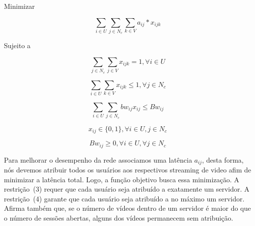 
Minimizar

\begin{equation}\label{maximize}
\sum_{i \in U} 
\sum_{j \in N_{c}}
\sum_{k \in V}
a_{ij} \ast x_{ijk}
\end{equation}

Sujeito a

\begin{equation}\label{bound_1}
\sum_{ j \in N_{c} }
\sum_{ j \in V}
x_{ijk} = 1,  \forall i \in U
\end{equation}

\begin{equation}\label{bound_1}
\sum_{ i \in U}
\sum_{ k \in V }
x_{ijk} \leq 1,  \forall j \in N_{c}
\end{equation}

\begin{equation}\label{minimize}
\sum_{i \in U}
\sum_{j \in N_{c}}
bw_{ij} x_{ij}
\leq Bw_{ij}
\end{equation}

\begin{equation}\label{minimize}
x_{ij}  \in  \{0, 1\}, \forall i \in U,j \in N_{c}
\end{equation}

\begin{equation}\label{minimize}
Bw_{ij} \geq  0, \forall i \in U,  \forall j \in N_{c}
\end{equation}
\vspace{1.2cm}

Para melhorar o desempenho da rede associamos uma latência $a_{ij}$, desta forma, nós devemos atribuir todos os usuários aos respectivos streaming de video afim de minimizar a latência total.
Logo, a função objetivo busca essa minimização. A restrição~(3) requer que cada usuário seja atribuído a exatamente um servidor. A restrição~(4) garante que cada usuário seja atribuído a no máximo um servidor. Afirma também que, se o número de vídeos dentro de um servidor é maior do que o número de sessões abertas, alguns dos vídeos permanecem sem atribuição.%


